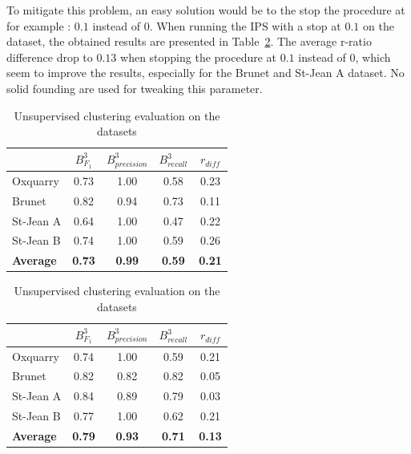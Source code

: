 To mitigate this problem, an easy solution would be to the stop the procedure at for example : $0.1$ instead of $0$.
When running the IPS with a stop at $0.1$ on the dataset, the obtained results are presented in Table~\ref{tab:unsupervised_clustering_01}.
The average r-ratio difference drop to $0.13$ when stopping the procedure at $0.1$ instead of $0$, which seem to improve the results, especially for the Brunet and St-Jean A dataset.
No solid founding are used for tweaking this parameter.

\begin{table}
  \centering
  \caption{Unsupervised clustering evaluation on the datasets}
  \label{tab:unsupervised_clustering}

  \label{tab:unsupervised_clustering_0}
  \begin{tabular}{l c c c c}
    \toprule
    &
    $B^3_{F_1}$ &
    $B^3_{precision}$  &
    $B^3_{recall}$  &
    $r_{diff}$ \\
    \midrule
    Oxquarry         & 0.73 & 1.00 & 0.58 & 0.23\\
    Brunet           & 0.82 & 0.94 & 0.73 & 0.11\\
    St-Jean A        & 0.64 & 1.00 & 0.47 & 0.22\\
    St-Jean B        & 0.74 & 1.00 & 0.59 & 0.26\\
    \textbf{Average} &
    \textbf{0.73} &
    \textbf{0.99} &
    \textbf{0.59} &
    \textbf{0.21} \\
    \bottomrule
  \end{tabular}

  \label{tab:unsupervised_clustering_01}
  \begin{tabular}{l c c c c}
    \toprule
    &
    $B^3_{F_1}$ &
    $B^3_{precision}$  &
    $B^3_{recall}$  &
    $r_{diff}$ \\
    \midrule
    Oxquarry         & 0.74 & 1.00 & 0.59 & 0.21\\
    Brunet           & 0.82 & 0.82 & 0.82 & 0.05\\
    St-Jean A        & 0.84 & 0.89 & 0.79 & 0.03\\
    St-Jean B        & 0.77 & 1.00 & 0.62 & 0.21\\
    \textbf{Average} &
    \textbf{0.79} &
    \textbf{0.93} &
    \textbf{0.71} &
    \textbf{0.13} \\
    \bottomrule
  \end{tabular}
\end{table}

